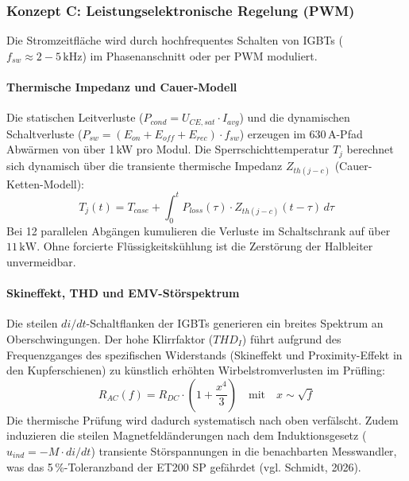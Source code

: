 \subsubsection{Konzept C: Leistungselektronische Regelung (PWM)}

Die Stromzeitfläche wird durch hochfrequentes Schalten von IGBTs ($f_{sw} \approx 2-5\,\text{kHz}$) im Phasenanschnitt oder per PWM moduliert.
\paragraph{Thermische Impedanz und Cauer-Modell}
Die statischen Leitverluste ($P_{cond} = U_{CE,sat} \cdot I_{avg}$) und die dynamischen Schaltverluste ($P_{sw} = (E_{on} + E_{off} + E_{rec}) \cdot f_{sw}$) erzeugen im 630\,A-Pfad Abwärmen von über 1\,kW pro Modul. Die Sperrschichttemperatur $T_j$ berechnet sich dynamisch über die transiente thermische Impedanz $Z_{th(j-c)}$ (Cauer-Ketten-Modell):
\begin{equation}
    T_j(t) = T_{case} + \int_{0}^{t} P_{loss}(\tau) \cdot Z_{th(j-c)}(t-\tau) \, d\tau
\end{equation}
Bei 12 parallelen Abgängen kumulieren die Verluste im Schaltschrank auf über $11\,\text{kW}$. Ohne forcierte Flüssigkeitskühlung ist die Zerstörung der Halbleiter unvermeidbar.
\paragraph{Skineffekt, THD und EMV-Störspektrum}
Die steilen $di/dt$-Schaltflanken der IGBTs generieren ein breites Spektrum an Oberschwingungen. Der hohe Klirrfaktor ($THD_I$) führt aufgrund des Frequenzganges des spezifischen Widerstands (Skineffekt und Proximity-Effekt in den Kupferschienen) zu künstlich erhöhten Wirbelstromverlusten im Prüfling:
\begin{equation}
    R_{AC}(f) = R_{DC} \cdot \left(1 + \frac{x^4}{3} \right) \quad \text{mit} \quad x \sim \sqrt{f}
\end{equation}
Die thermische Prüfung wird dadurch systematisch nach oben verfälscht. Zudem induzieren die steilen Magnetfeldänderungen nach dem Induktionsgesetz ($u_{ind} = - M \cdot di/dt$) transiente Störspannungen in die benachbarten Messwandler, was das 5\,\%-Toleranzband der ET200 SP gefährdet (vgl. Schmidt, 2026).
